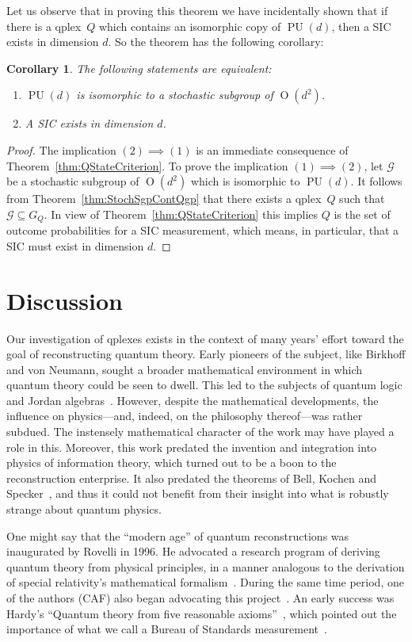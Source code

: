 \documentclass[aps,pra,superscriptaddress,10pt,tightenlines,twocolumn,nofootinbib]{revtex4}
\newtheorem{corollary}[theorem]{Corollary}
\theoremstyle{remark}
\newcommand{\qp}{Q}
\newcommand{\gp}{\mathcal{G}}
\newcommand{\qplex}{qplex}
\newcommand{\qgp}[1]{G_{#1}}
\DeclareMathOperator{\Ot}{O}
\DeclareMathOperator{\PU}{PU}
\begin{document}
Let us observe that in proving this theorem we have incidentally shown that if there is  a \qplex\ $\qp$ which contains an isomorphic copy of $\PU(d)$, then a SIC exists in dimension $d$.  So the theorem has the following corollary:
\begin{corollary}
The following statements are equivalent:
\begin{enumerate}
\item  $\PU(d)$ is isomorphic to a stochastic subgroup of $\Ot(d^2)$.
\item A SIC exists in dimension $d$.
\end{enumerate}
\end{corollary}
\begin{proof}
The implication $(2)\implies (1)$ is an immediate consequence of Theorem~\ref{thm:QStateCriterion}.  To prove the implication $(1) \implies (2)$, let $\gp$ be a stochastic subgroup of $\Ot(d^2)$ which is isomorphic to $\PU(d)$.  It follows from Theorem~\ref{thm:StochSgpContQgp} that there exists a \qplex\ $\qp$ such that $\gp \subseteq \qgp{\qp}$.  In view of Theorem~\ref{thm:QStateCriterion} this implies $\qp$ is the set of outcome probabilities  for a SIC measurement, which means, in particular, that a SIC must exist in dimension $d$.
\end{proof}

\section{Discussion}
\label{sec:future}
Our investigation of qplexes exists in the context of many years' effort toward the goal of reconstructing quantum theory.  Early pioneers of the subject, like Birkhoff and von Neumann, sought a broader mathematical environment in which quantum theory could be seen to dwell.  This led to the subjects of quantum logic and Jordan algebras~\cite{Mccrimmon}.  However, despite the mathematical developments, the influence on physics---and, indeed, on the philosophy thereof---was rather subdued.  The instensely mathematical character of the work may have played a role in this.  Moreover, this work predated the invention and integration into physics of information theory, which turned out to be a boon to the reconstruction enterprise.  It also predated the theorems of Bell, Kochen and Specker~\cite{mermin1993, mermin1993-erratum}, and thus it could not benefit from their insight into what is robustly strange about quantum physics.

One might say that the ``modern age'' of quantum reconstructions was inaugurated by Rovelli in 1996.  He advocated a research program of deriving quantum theory from physical principles, in a manner analogous to the derivation of special relativity's mathematical formalism~\cite{Rovelli1996}.  During the same time period, one of the authors (CAF) also began advocating this project~\cite{fuchs2002, fuchs2010, transcript}.  An early success was Hardy's ``Quantum theory from five reasonable axioms''~\cite{Hardy01, Schack03}, which pointed out the importance of what we call a Bureau of Standards measurement~\cite[p.\ 368]{Fuchs2014}.
\end{document}
